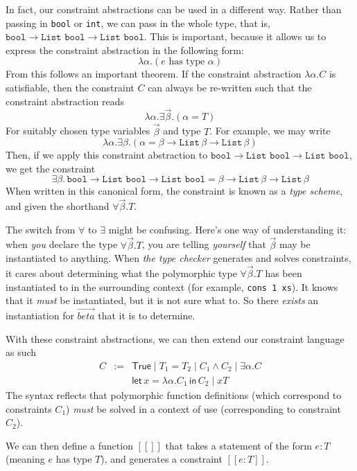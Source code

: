 {In fact, our constraint abstractions can be used in a different way. Rather than passing in \texttt{bool} or \texttt{int}, we can pass in the whole type, that is, $\texttt{bool} \to \texttt{List bool} \to \texttt{List bool}$. This is important, because it allows us to express the constraint abstraction in the following form:
\[ \lambda \alpha. (e \text{ has type } \alpha) \]
From this follows an important theorem. If the constraint abstraction $\lambda \alpha. C$ is satisfiable, then the constraint $C$ can always be re-written such that the constraint abstraction reads
\[\lambda \alpha. \exists \vec{\beta}. (\alpha = T)\]
For suitably chosen type variables $\vec{\beta}$ and  type $T$. For example, we may write
\[\lambda \alpha. \exists \beta. (\alpha = \beta \to \texttt{List}\, \beta \to \texttt{List}\, \beta)\]
Then, if we apply this constraint abstraction to $\texttt{bool} \to \texttt{List bool} \to \texttt{List bool}$, we get the constraint
\[\exists \beta . \, \texttt{bool} \to \texttt{List bool} \to \texttt{List bool} = \beta \to \texttt{List}\, \beta \to \texttt{List}\, \beta\]
When written in this canonical form, the constraint is known as a \textit{type scheme}, and given the shorthand $\forall \vec{\beta}. T$. 

The switch from $\forall$ to $\exists$ might be confusing. Here's one way of understanding it: when \textit{you} declare the type $\forall \vec{\beta}. T$, you are telling \textit{yourself} that $\vec{\beta}$ may be instantiated to anything. When \textit{the type checker} generates and solves constraints, it cares about determining what the polymorphic type $\forall \vec{\beta}. T$ has been instantiated to in the surrounding context (for example, \texttt{cons 1 xs}). It knows that it \textit{must} be instantiated, but it is not sure what to. So there \textit{exists} an instantiation for $\vec{beta}$ that it is to determine.

With these constraint abstractions, we can then extend our constraint language as such
\[\begin{array}{lcl}
     C&:=&\textsf{True} \mid T_1 = T_2 \mid C_1 \land C_2 \mid \exists \alpha . C \\
        &&\textsf{let}\, x = \lambda \alpha . C_1 \, \textsf{in} \, C_2 \mid x T
     \end{array}
\]
The syntax reflects that polymorphic function definitions (which correspond to constraints $C_1$) \textit{must} be solved in a context of use (corresponding to constraint $C_2$).

\newcommand{\interpret}[1]{[\![#1]\!]}
We can then define a function $\interpret{}$ that takes a statement of the form $e: T$ (meaning $e$ has type $T$), and generates a constraint $\interpret{e: T}$.

}
